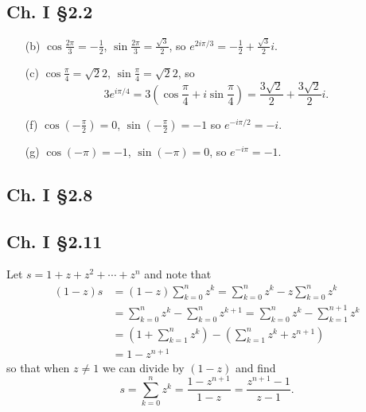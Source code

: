 \documentclass{article}
\begin{document}
\subsection*{Ch. I \S 2.2}
\begin{itemize}
  \item[(b)]{
    $\cos \frac{2 \pi}{3} = -\frac{1}{2}$,
    $\sin \frac{2 \pi}{3} = \frac{\sqrt{3}}{2}$,
    so $e^{2 i \pi / 3} = -\frac{1}{2} + \frac{\sqrt{3}}{2} i$.
  }
  \item[(c)]{
    $\cos \frac{\pi}{4} = \sqrt{2}{2}$,
    $\sin \frac{\pi}{4} = \sqrt{2}{2}$,
    so
    $$
      3 e^{i \pi / 4}
    = 3(\cos \frac{\pi}{4} + i \sin \frac{\pi}{4})
    = \frac{3 \sqrt{2}}{2} + \frac{3 \sqrt{2}}{2} i.
    $$
  }
  \item[(f)]{
    $\cos \left(-\frac{\pi}{2}\right) = 0$,
    $\sin \left(-\frac{\pi}{2}\right) = -1$
    so $e^{-i \pi / 2} = -i$.
  }
  \item[(g)]{
    $\cos (-\pi) = -1$,
    $\sin (-\pi) = 0$,
    so $e^{-i\pi} = -1$.
  }
\end{itemize}

\subsection*{Ch. I \S 2.8}

\subsection*{Ch. I \S 2.11}
Let $s = 1 + z + z^2 + \cdots + z^n$ and note that
\begin{align*}
   (1 - z)s
&= (1 - z)\sum_{k=0}^n z^k
 = \sum_{k=0}^n z^k - z\sum_{k=0}^n z^k \\
&= \sum_{k=0}^n z^k - \sum_{k=0}^n z^{k+1}
 = \sum_{k=0}^n z^k - \sum_{k=1}^{n+1} z^{k} \\
&= \left(1 + \sum_{k=1}^n z^k\right) - \left(\sum_{k=1}^n z^k +
  z^{n+1}\right) \\
&= 1 - z^{n+1}
\end{align*}
so that when $z \neq 1$ we can divide by $(1 - z)$ and find
$$
  s
= \sum_{k=0}^n z^k = \frac{1 - z^{n+1}}{1 - z}
= \frac{z^{n+1} - 1}{z - 1}.
$$
\end{document}
